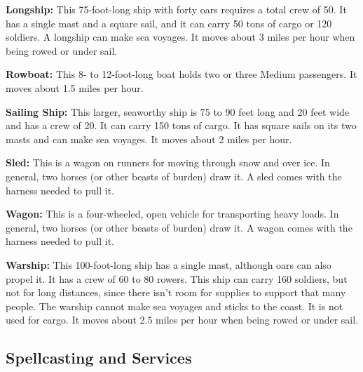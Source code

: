 \textbf{Longship:} This 75-foot-long ship with forty oars requires a total crew 
of 50. It has a single mast and a square sail, and it can carry 50 tons of cargo 
or 120 soldiers. A longship can make sea voyages. It moves about 3 miles per hour 
when being rowed or under sail.

\textbf{Rowboat:} This 8- to 12-foot-long boat holds two or three Medium passengers. 
It moves about 1.5 miles per hour.

\textbf{Sailing Ship:} This larger, seaworthy ship is 75 to 90 feet long and 20 
feet wide and has a crew of 20. It can carry 150 tons of cargo. It has square sails 
on its two masts and can make sea voyages. It moves about 2 miles per hour.

\textbf{Sled:} This is a wagon on runners for moving through snow and over ice. 
In general, two horses (or other beasts of burden) draw it. A sled comes with the 
harness needed to pull it.

\textbf{Wagon:} This is a four-wheeled, open vehicle for transporting heavy loads. 
In general, two horses (or other beasts of burden) draw it. A wagon comes with 
the harness needed to pull it.

\textbf{Warship:} This 100-foot-long ship has a single mast, although oars can 
also propel it. It has a crew of 60 to 80 rowers. This ship can carry 160 soldiers, 
but not for long distances, since there isn't room for supplies to support that 
many people. The warship cannot make sea voyages and sticks to the coast. It is 
not used for cargo. It moves about 2.5 miles per hour when being rowed or under 
sail.

\subsection{Spellcasting and Services}

